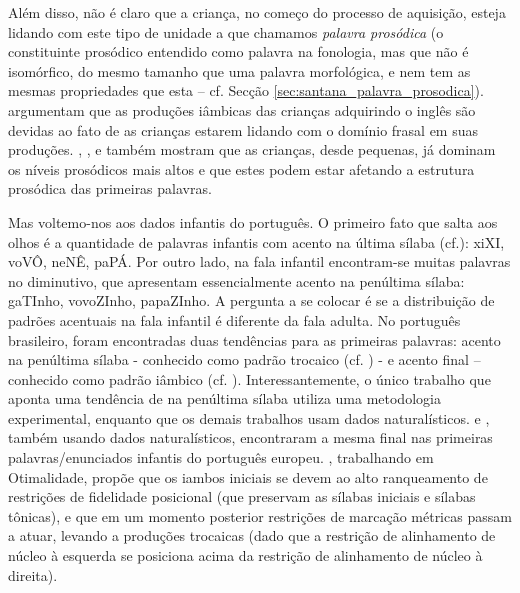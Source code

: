 \documentclass[output=paper]{LSP/langsci}
\begin{document}
Além disso, não é claro que a criança, no começo do processo de aquisição, esteja lidando com este tipo de unidade a que chamamos \textit{palavra prosódica} (o constituinte prosódico entendido como palavra na fonologia, mas que não é isomórfico, do mesmo tamanho que uma palavra morfológica, e nem tem as mesmas propriedades que esta – cf. Secção \ref{sec:santana_palavra_prosodica}). \citet{vihman_etal1998} argumentam que as produções iâmbicas das crianças adquirindo o inglês são devidas ao fato de as crianças estarem lidando com o domínio frasal em suas produções. \citet{correia_etal2006}, \citet{grimm2006}, \citet{correia2009} e \citet{frotavigario2008} também mostram que as crianças, desde pequenas, já dominam os níveis prosódicos mais altos e que estes podem estar afetando a estrutura prosódica das primeiras palavras.

Mas voltemo-nos aos dados infantis do português. O primeiro fato que salta aos olhos é a quantidade de palavras infantis com acento na última sílaba (cf.\citealt{stoelgammon1976}): xiXI, voVÔ, neNÊ, paPÁ. Por outro lado, na fala infantil encon\-tram-se muitas palavras no diminutivo, que apresentam essencialmente acento na penúltima sílaba: gaTInho, vovoZInho, papaZInho. A pergunta a se colocar é se a distribuição de padrões acentuais na fala infantil é diferente da fala adulta. No português brasileiro, foram encontradas duas tendências para as primeiras palavras: acento na penúltima sílaba - conhecido como padrão trocaico (cf. \citealt{rapp1994}) - e acento final – conhecido como padrão iâmbico (cf. \citealt{santos2001,santos2007,bonilha2004,baia2008,baia2012,ferreiragoncalcesbrum2011}). Interessantemente, o único trabalho que aponta uma tendência de  na penúltima sílaba utiliza uma metodologia experimental, enquanto que os demais trabalhos usam dados naturalísticos. \citet{correia_etal2006} e \citet{correia2009}, também usando dados naturalísticos, encontraram a mesma  final nas primeiras palavras/enunciados infantis do português europeu. \citet{bonilha2004}, trabalhando em Otimalidade, propõe que os iambos iniciais se devem ao alto ranqueamento de restrições de fidelidade posicional (que preservam as sílabas iniciais e sílabas tônicas), e que em um momento posterior restrições de marcação métricas passam a atuar, levando a produções trocaicas (dado que a restrição de alinhamento de núcleo à esquerda se posiciona acima da restrição de alinhamento de núcleo à direita).
\end{document}
